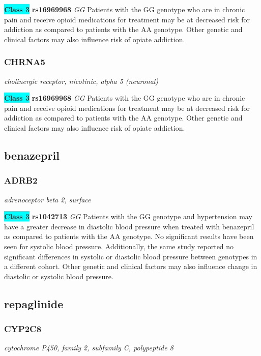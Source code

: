 \documentclass{report}
\begin{document}
\textbf{\colorbox{cyan} {Class 3}} \textbf{ rs16969968 } \textit{ GG }
Patients with the GG genotype who are in chronic pain and receive opioid medications for treatment may be at decreased risk for addiction as compared to patients with the AA genotype. Other genetic and clinical factors may also influence risk of opiate addiction.\newline\subsubsection{ CHRNA5 }
\textit{ cholinergic receptor, nicotinic, alpha 5 (neuronal) }

\textbf{\colorbox{cyan} {Class 3}} \textbf{ rs16969968 } \textit{ GG }
Patients with the GG genotype who are in chronic pain and receive opioid medications for treatment may be at decreased risk for addiction as compared to patients with the AA genotype. Other genetic and clinical factors may also influence risk of opiate addiction.\newline\subsection{ benazepril }\subsubsection{ ADRB2 }
\textit{ adrenoceptor beta 2, surface }

\textbf{\colorbox{cyan} {Class 3}} \textbf{ rs1042713 } \textit{ GG }
Patients with the GG genotype and hypertension may have a greater decrease in diastolic blood pressure when treated with benazepril as compared to patients with the AA genotype. No significant results have been seen for systolic blood pressure. Additionally, the same study reported no significant differences in systolic or diastolic blood pressure between genotypes in a different cohort. Other genetic and clinical factors may also influence change in diastolic or systolic blood pressure.\newline\subsection{ repaglinide }\subsubsection{ CYP2C8 }
\textit{ cytochrome P450, family 2, subfamily C, polypeptide 8 }
\end{document}

